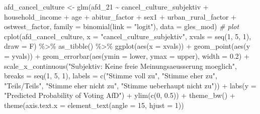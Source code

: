 \documentclass[
]{article}
\newenvironment{Shaded}{\begin{snugshade}}{\end{snugshade}}
\newcommand{\AttributeTok}[1]{\textcolor[rgb]{0.77,0.63,0.00}{#1}}
\newcommand{\CommentTok}[1]{\textcolor[rgb]{0.56,0.35,0.01}{\textit{#1}}}
\newcommand{\DecValTok}[1]{\textcolor[rgb]{0.00,0.00,0.81}{#1}}
\newcommand{\FloatTok}[1]{\textcolor[rgb]{0.00,0.00,0.81}{#1}}
\newcommand{\FunctionTok}[1]{\textcolor[rgb]{0.00,0.00,0.00}{#1}}
\newcommand{\NormalTok}[1]{#1}
\newcommand{\OtherTok}[1]{\textcolor[rgb]{0.56,0.35,0.01}{#1}}
\newcommand{\SpecialCharTok}[1]{\textcolor[rgb]{0.00,0.00,0.00}{#1}}
\newcommand{\StringTok}[1]{\textcolor[rgb]{0.31,0.60,0.02}{#1}}
\begin{document}
\begin{Shaded}
\begin{Highlighting}[]
\NormalTok{afd\_cancel\_culture }\OtherTok{\textless{}{-}} \FunctionTok{glm}\NormalTok{(afd\_21 }\SpecialCharTok{\textasciitilde{}}\NormalTok{ cancel\_culture\_subjektiv }\SpecialCharTok{+}\NormalTok{ household\_income }\SpecialCharTok{+}\NormalTok{ age }\SpecialCharTok{+}\NormalTok{ abitur\_factor }\SpecialCharTok{+}\NormalTok{ sex1 }\SpecialCharTok{+}\NormalTok{ urban\_rural\_factor }\SpecialCharTok{+}\NormalTok{ ostwest\_factor, }\AttributeTok{family =} \FunctionTok{binomial}\NormalTok{(}\AttributeTok{link =} \StringTok{"logit"}\NormalTok{), }\AttributeTok{data =}\NormalTok{ gles\_mod)}
\CommentTok{\# plot}
\FunctionTok{cplot}\NormalTok{(afd\_cancel\_culture, }\AttributeTok{x =} \StringTok{"cancel\_culture\_subjektiv"}\NormalTok{, }
      \AttributeTok{xvals =} \FunctionTok{seq}\NormalTok{(}\DecValTok{1}\NormalTok{, }\DecValTok{5}\NormalTok{, }\DecValTok{1}\NormalTok{), }\AttributeTok{draw =}\NormalTok{ F) }\SpecialCharTok{\%\textgreater{}\%}
  \FunctionTok{as\_tibble}\NormalTok{() }\SpecialCharTok{\%\textgreater{}\%}
  \FunctionTok{ggplot}\NormalTok{(}\FunctionTok{aes}\NormalTok{(}\AttributeTok{x =}\NormalTok{ xvals)) }\SpecialCharTok{+}
  \FunctionTok{geom\_point}\NormalTok{(}\FunctionTok{aes}\NormalTok{(}\AttributeTok{y =}\NormalTok{ yvals)) }\SpecialCharTok{+}
  \FunctionTok{geom\_errorbar}\NormalTok{(}\FunctionTok{aes}\NormalTok{(}\AttributeTok{ymin =}\NormalTok{ lower, }\AttributeTok{ymax =}\NormalTok{ upper), }\AttributeTok{width =} \FloatTok{0.2}\NormalTok{) }\SpecialCharTok{+}
  \FunctionTok{scale\_x\_continuous}\NormalTok{(}\StringTok{"Subjektiv: Keine freie Meinungsaeusserung moeglich"}\NormalTok{, }
                   \AttributeTok{breaks =} \FunctionTok{seq}\NormalTok{(}\DecValTok{1}\NormalTok{, }\DecValTok{5}\NormalTok{, }\DecValTok{1}\NormalTok{),}
                   \AttributeTok{labels =} \FunctionTok{c}\NormalTok{(}\StringTok{"Stimme voll zu"}\NormalTok{, }\StringTok{"Stimme eher zu"}\NormalTok{,}
                              \StringTok{"Teils/Teils"}\NormalTok{, }\StringTok{"Stimme eher nicht zu"}\NormalTok{,}
                              \StringTok{"Stimme ueberhaupt nicht zu"}\NormalTok{)) }\SpecialCharTok{+}
  \FunctionTok{labs}\NormalTok{(}\AttributeTok{y =} \StringTok{"Predicted Probability of Voting AfD"}\NormalTok{) }\SpecialCharTok{+}
  \FunctionTok{ylim}\NormalTok{(}\FunctionTok{c}\NormalTok{(}\DecValTok{0}\NormalTok{, }\FloatTok{0.5}\NormalTok{)) }\SpecialCharTok{+}
  \FunctionTok{theme\_bw}\NormalTok{() }\SpecialCharTok{+}
  \FunctionTok{theme}\NormalTok{(}\AttributeTok{axis.text.x =} \FunctionTok{element\_text}\NormalTok{(}\AttributeTok{angle =} \DecValTok{15}\NormalTok{, }\AttributeTok{hjust =} \DecValTok{1}\NormalTok{))}
\end{Highlighting}
\end{Shaded}
\end{document}

